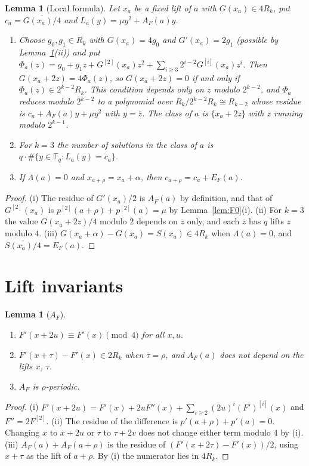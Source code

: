 \documentclass[11pt]{article}
\newtheorem{lemma}[theorem]{Lemma}
\theoremstyle{definition}
\theoremstyle{remark}
\newcommand{\F}{\mathbb{F}}
\newcommand{\ol}[1]{\overline{#1}}
\begin{document}
\begin{lemma}[Local formula]\label{lem:local}
Let $x_a$ be a fixed lift of $a$ with $G(x_a)\in4R_k$, put $c_a=\ol{G(x_a)/4}$ and
$L_a(y)=\mu y^2+A_F(a)y$.
\begin{enumerate}[label=(\roman*)]
\item Choose $g_0,g_1\in R_k$ with $G(x_a)=4g_0$ and $G'(x_a)=2g_1$ (possible by Lemma~\ref{lem:A}(ii)) and put
$\Phi_a(z)=g_0+g_1z+G^{[2]}(x_a)z^2+\sum_{i\ge3}2^{i-2}G^{[i]}(x_a)z^i$. Then $G(x_a+2z)=4\Phi_a(z)$, so
$G(x_a+2z)=0$ if and only if $\Phi_a(z)\in2^{k-2}R_k$. This condition depends only on $z$ modulo $2^{k-2}$, and
$\Phi_a$ reduces modulo $2^{k-2}$ to a polynomial over $R_k/2^{k-2}R_k\cong R_{k-2}$ whose residue is
$c_a+A_F(a)y+\mu y^2$ with $y=\ol z$. The class of $a$ is $\{x_a+2z\}$ with $z$ running modulo $2^{k-1}$.
\item For $k=3$ the number of solutions in the class of $a$ is $q\cdot\#\{y\in\F_q:L_a(y)=c_a\}$.
\item If $\Lambda(a)=0$ and $x_{a+\rho}=x_a+\alpha$, then $c_{a+\rho}=c_a+E_F(a)$.
\end{enumerate}
\end{lemma}
\begin{proof}
(i) The residue of $G'(x_a)/2$ is $A_F(a)$ by definition, and that of $G^{[2]}(x_a)$ is
$p^{[2]}(a+\rho)+p^{[2]}(a)=\mu$ by Lemma~\ref{lem:F0}(i).
(ii) For $k=3$ the value $G(x_a+2z)/4$ modulo $2$ depends on $\ol z$ only, and each $\ol z$ has $q$ lifts
$z$ modulo $4$.
(iii) $G(x_a+\alpha)-G(x_a)=S(x_a)\in4R_k$ when $\Lambda(a)=0$, and $\ol{S(x_a)/4}=E_F(a)$.
\end{proof}

\section{Lift invariants}\label{sec:invariants}

\begin{lemma}[$A_F$]\label{lem:A}
\begin{enumerate}[label=(\roman*)]
\item $F'(x+2u)\equiv F'(x)\pmod4$ for all $x,u$.
\item $F'(x+\tau)-F'(x)\in2R_k$ when $\ol\tau=\rho$, and $A_F(a)$ does not depend on the lifts $x$, $\tau$.
\item $A_F$ is $\rho$-periodic.
\end{enumerate}
\end{lemma}
\begin{proof}
(i) $F'(x+2u)=F'(x)+2uF''(x)+\sum_{i\ge2}(2u)^i(F')^{[i]}(x)$ and $F''=2F^{[2]}$.
(ii) The residue of the difference is $p'(a+\rho)+p'(a)=0$. Changing $x$ to $x+2u$ or $\tau$ to $\tau+2v$
does not change either term modulo $4$ by (i).
(iii) $A_F(a)+A_F(a+\rho)$ is the residue of $(F'(x+2\tau)-F'(x))/2$, using $x+\tau$ as the lift of
$a+\rho$. By (i) the numerator lies in $4R_k$.
\end{proof}
\end{document}
